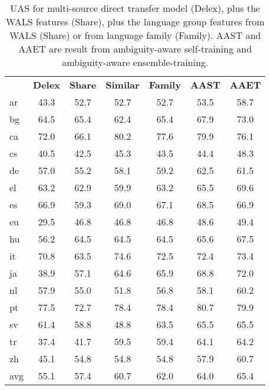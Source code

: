 \begin{table}
\centering
\begin{tabular}{lcccccc}
    & \textbf{Delex} & \textbf{Share} & \textbf{Similar} & \textbf{Family}& \textbf{AAST} & \textbf{AAET} \\
ar  & 43.3  & 52.7  & 52.7    & 52.7   & 53.5 & 58.7 \\
bg  & 64.5  & 65.4  & 62.4    & 65.4   & 67.9 & 73.0 \\
ca  & 72.0  & 66.1  & 80.2    & 77.6   & 79.9 & 76.1 \\
cs  & 40.5  & 42.5  & 45.3    & 43.5   & 44.4 & 48.3 \\
de  & 57.0  & 55.2  & 58.1    & 59.2   & 62.5 & 61.5 \\
el  & 63.2  & 62.9  & 59.9    & 63.2   & 65.5 & 69.6 \\
es  & 66.9  & 59.3  & 69.0    & 67.1   & 68.5 & 66.9 \\
eu  & 29.5  & 46.8  & 46.8    & 46.8   & 48.6 & 49.4 \\
hu  & 56.2  & 64.5  & 64.5    & 64.5   & 65.6 & 67.5 \\
it  & 70.8  & 63.5  & 74.6    & 72.5   & 72.4 & 73.4 \\
ja  & 38.9  & 57.1  & 64.6    & 65.9   & 68.8 & 72.0 \\
nl  & 57.9  & 55.0  & 51.8    & 56.8   & 58.1 & 60.2 \\
pt  & 77.5  & 72.7  & 78.4    & 78.4   & 80.7 & 79.9 \\
sv  & 61.4  & 58.8  & 48.8    & 63.5   & 65.5 & 65.5 \\
tr  & 37.4  & 41.7  & 59.5    & 59.4   & 64.1 & 64.2 \\
zh  & 45.1  & 54.8  & 54.8    & 54.8   & 57.9 & 60.7 \\
\hline
avg & 55.1  & 57.4  & 60.7    & 62.0   & 64.0 & 65.4    
\end{tabular}
\caption{UAS for multi-source direct transfer model (Delex), plus the WALS features (Share), plus the language group features from WALS (Share) or from language family (Family). AAST and AAET are result from ambiguity-aware self-training and ambiguity-aware ensemble-training.}
\label{tab:tackstrom2013:WALSfeatures}
\end{table}
